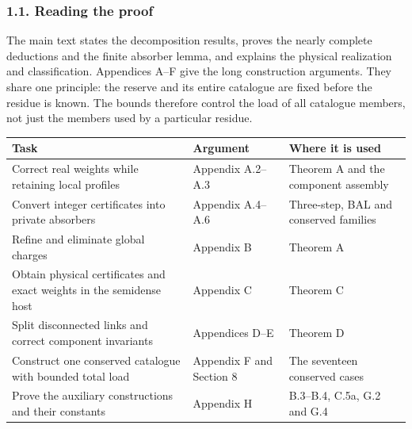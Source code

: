 \documentclass[english,11pt,a4paper]{article}
\begin{document}
\subsubsection{1.1. Reading the proof}\label{reading-the-proof}

The main text states the decomposition results, proves the nearly complete deductions and the finite absorber lemma, and explains the physical realization and classification. Appendices A--F give the long construction arguments. They share one principle: the reserve and its entire catalogue are fixed before the residue is known. The bounds therefore control the load of all catalogue members, not just the members used by a particular residue.

{\begin{longtable}[]{@{}
  >{\raggedright\arraybackslash}p{}
  >{\raggedright\arraybackslash}p{}
  >{\raggedright\arraybackslash}p{}@{}}
\toprule\noalign{}
\begin{minipage}[b]{\linewidth}\raggedright
Task
\end{minipage} & \begin{minipage}[b]{\linewidth}\raggedright
Argument
\end{minipage} & \begin{minipage}[b]{\linewidth}\raggedright
Where it is used
\end{minipage} \\
\midrule\noalign{}
\endhead
\bottomrule\noalign{}
\endlastfoot
Correct real weights while retaining local profiles & Appendix A.2--A.3 & Theorem A and the component assembly \\
Convert integer certificates into private absorbers & Appendix A.4--A.6 & Three-step, BAL and conserved families \\
Refine and eliminate global charges & Appendix B & Theorem A \\
Obtain physical certificates and exact weights in the semidense host & Appendix C & Theorem C \\
Split disconnected links and correct component invariants & Appendices D--E & Theorem D \\
Construct one conserved catalogue with bounded total load & Appendix F and Section 8 & The seventeen conserved cases \\
Prove the auxiliary constructions and their constants & Appendix H & B.3--B.4, C.5a, G.2 and G.4 \\
\end{longtable}
}
\end{document}

